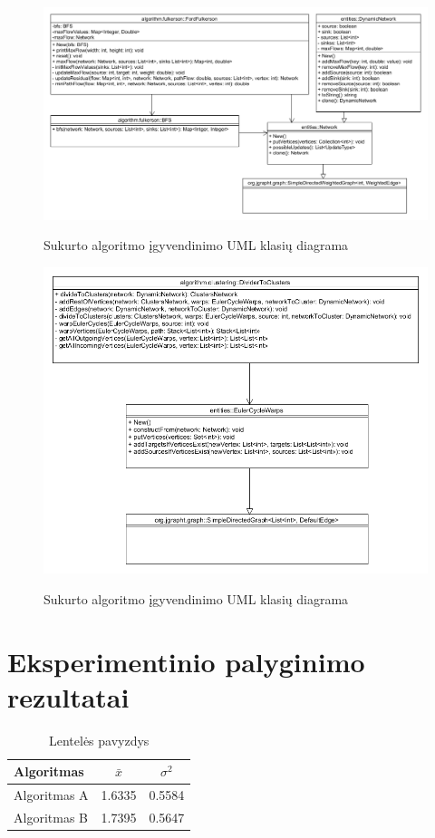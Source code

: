 \documentclass{VUMIFInfBakalaurinis}
\begin{document}
\begin{figure}[h]
	\caption{Sukurto algoritmo įgyvendinimo UML klasių diagrama}
	\centering
	\includegraphics[width=1.5\textwidth, height=0.6\textheight, angle=90]{img/architecture1.png}
	\label{fig:architecture1}
\end{figure}

\begin{figure}[h]
	\caption{Sukurto algoritmo įgyvendinimo UML klasių diagrama}
	\centering
	\includegraphics[width=\textwidth, height=0.6\textheight]{img/architecture2.png}
	\label{fig:architecture2}
\end{figure}

\section{Eksperimentinio palyginimo rezultatai}
\begin{table}[H]\footnotesize
  \centering
  \caption{Lentelės pavyzdys}
  {\begin{tabular}{|l|c|c|} \hline
    Algoritmas & $\bar{x}$ & $\sigma^{2}$ \\
    \hline
    Algoritmas A  & 1.6335    & 0.5584       \\
    Algoritmas B  & 1.7395    & 0.5647       \\
    \hline
  \end{tabular}}
  \label{tab:table example}
\end{table}
\end{document}
